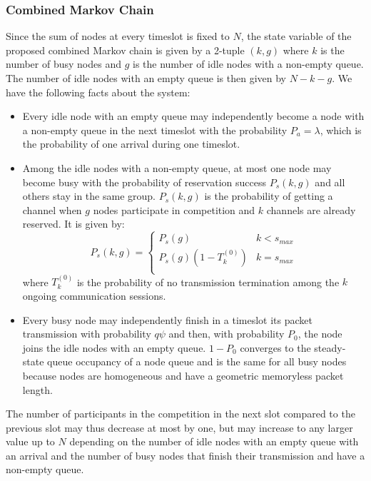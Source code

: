 \documentclass[12pt,journal,oneside,onecolumn]{IEEEtran}
\begin{document}
\subsubsection{Combined Markov Chain}
\label{subsub:combined}
Since the sum of nodes at every timeslot is fixed to $N$, the state variable of the proposed combined Markov chain is given by a 2-tuple $(k,g)$ 
where $k$ is the number of busy nodes and $g$ is the number of idle nodes with a non-empty queue. 
The number of idle nodes with an empty queue is then given by $N-k-g$. 
We have the following facts about the system:
\begin{itemize}
	\item Every idle node with an empty queue may independently become a node with a non-empty queue in the next timeslot 
with the probability $P_a=\lambda$, which is the probability of one arrival during one timeslot. 
	\item Among the idle nodes with a non-empty queue, at most one node may become busy with the probability of reservation success $P_s(k,g)$ and
all others stay in the same group. $P_s(k,g)$ is the probability of getting a channel when $g$ nodes participate in competition and $k$ channels are already reserved. It is given by:
\begin{equation}
P_s(k,g)=\begin{cases}
P_s(g) & k<s_{max} \\
P_s(g) (1-T_k^{(0)})  & k=s_{max}\\
\end{cases}
\label{eq:ps(k,g)}
\end{equation}
where $T_k^{(0)}$ is the probability of no transmission termination among the $k$ ongoing communication sessions.
\item Every busy node may independently finish in a timeslot its packet transmission with  probability $q\psi$ and then, with probability $P_0$, the node 
joins the idle nodes with an empty queue. $1-P_0$ converges to the steady-state queue occupancy of a node queue and 
is the same for all busy nodes because nodes are homogeneous and have a geometric memoryless packet length. 
\end{itemize}
The number of participants in the competition in the next slot compared to the previous slot may thus decrease at most by one, 
but may increase to any larger value up to $N$ depending on the number of idle nodes with an empty queue with an arrival and the number of busy nodes that finish
their transmission and have a non-empty queue.
	 	
\end{document}
